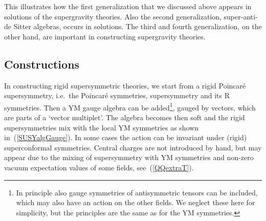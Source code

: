 \documentclass[a4paper,11pt,twoside]{article}
\begin{document}
This illustrates how the first generalization that we discussed above
appears in solutions of the supergravity theories. Also the second
generalization, super-anti-de Sitter algebras, occurs in solutions. The
third and fourth generalization, on the other hand, are important in
constructing supergravity theories.
\subsection{Constructions}\label{ss:construction}
In constructing rigid supersymmetric theories, we start from a rigid
Poincar{\'e} supersymmetry, i.e.\ the Poincar{\'e} symmetries, supersymmetry and
its R symmetries. Then a YM gauge algebra can be added\footnote{In
principle also gauge symmetries of antisymmetric tensors can be included,
which may also have an action on the other fields. We neglect these here
for simplicity, but the principles are the same as for the YM
symmetries.}, gauged by vectors, which are parts of a `vector multiplet'.
The algebra becomes then soft and the rigid supersymmetries mix with the
local YM symmetries as shown in~(\ref{SUSYalgGauge}). In some cases the
action can be invariant under (rigid) superconformal symmetries. Central
charges are not introduced by hand, but may appear due to the mixing of
supersymmetry with YM symmetries and non-zero vacuum expectation values
of some fields, see~(\ref{QQextraT}).
\end{document}
